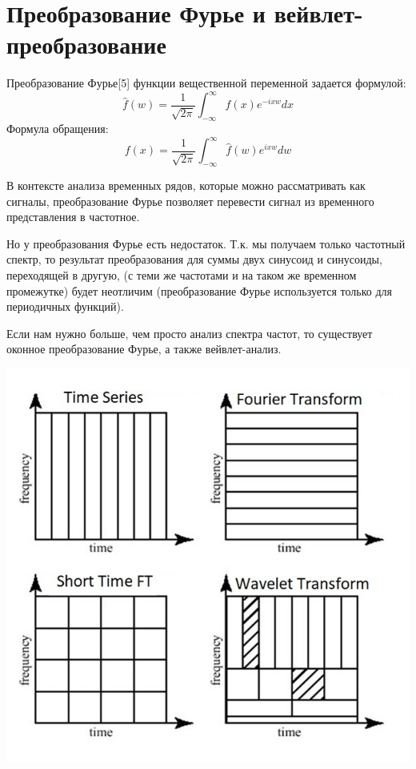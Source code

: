 \documentclass[a4paper]{article}
\begin{document}
	\section{Преобразование Фурье и вейвлет-преобразование}
	
	Преобразование Фурье[5] функции вещественной переменной задается формулой:
	$$ \hat{f}(w) = \frac{1}{\sqrt{2\pi}} \int_{-\infty}^{\infty} f(x) e^{-ixw} dx $$
	Формула обращения:
	$$ f(x) = \frac{1}{\sqrt{2\pi}} \int_{-\infty}^{\infty} \hat{f}(w) e^{ixw} dw $$
	
	В контексте анализа временных рядов, которые можно рассматривать как сигналы, преобразование Фурье позволяет перевести сигнал из временного представления в частотное.
	
	Но у преобразования Фурье есть недостаток. Т.к. мы получаем только частотный спектр, то результат преобразования для суммы двух синусоид и синусоиды, переходящей в другую, (с теми же частотами и на таком же временном промежутке) будет неотличим (преобразование Фурье используется только для периодичных функций).
	
	Если нам нужно больше, чем просто анализ спектра частот, то существует оконное преобразование Фурье, а также вейвлет-анализ.
	
	\begin{center}
		\includegraphics[scale=0.4]{./img1.jpg}
	\end{center}
	 
\end{document}
